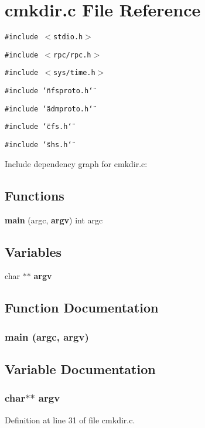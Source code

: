 \section{cmkdir.c File Reference}
\label{cmkdir_8c}


{\tt \#include $<$stdio.h$>$}\par
{\tt \#include $<$rpc/rpc.h$>$}\par
{\tt \#include $<$sys/time.h$>$}\par
{\tt \#include \char`\"{}nfsproto.h\char`\"{}}\par
{\tt \#include \char`\"{}admproto.h\char`\"{}}\par
{\tt \#include \char`\"{}cfs.h\char`\"{}}\par
{\tt \#include \char`\"{}shs.h\char`\"{}}\par


Include dependency graph for cmkdir.c:\subsection*{Functions}
\begin{CompactItemize}
\item 
{\bf main} (argc, {\bf argv}) int argc
\end{CompactItemize}
\subsection*{Variables}
\begin{CompactItemize}
\item 
char $\ast$$\ast$ {\bf argv}
\end{CompactItemize}


\subsection{Function Documentation}
\subsubsection{\setlength{\rightskip}{0pt plus 5cm}main (argc, {\bf argv})}\label{cmkdir_8c_a1}




\subsection{Variable Documentation}
\subsubsection{\setlength{\rightskip}{0pt plus 5cm}char$\ast$$\ast$ {\bf argv}}\label{cmkdir_8c_a0}




Definition at line 31 of file cmkdir.c.